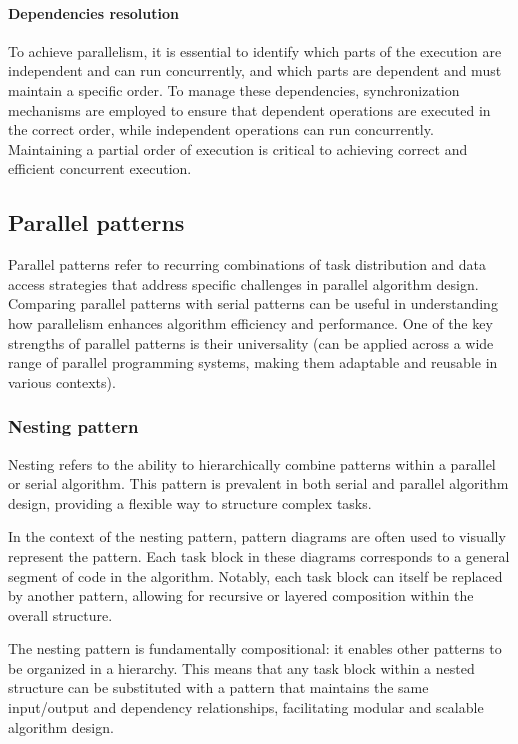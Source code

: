 \paragraph*{Dependencies resolution}
To achieve parallelism, it is essential to identify which parts of the execution are independent and can run concurrently, and which parts are dependent and must maintain a specific order.
To manage these dependencies, synchronization mechanisms are employed to ensure that dependent operations are executed in the correct order, while independent operations can run concurrently. 
Maintaining a partial order of execution is critical to achieving correct and efficient concurrent execution.

\subsection{Parallel patterns}
Parallel patterns refer to recurring combinations of task distribution and data access strategies that address specific challenges in parallel algorithm design. 
Comparing parallel patterns with serial patterns can be useful in understanding how parallelism enhances algorithm efficiency and performance.
One of the key strengths of parallel patterns is their universality (can be applied across a wide range of parallel programming systems, making them adaptable and reusable in various contexts).

\subsubsection{Nesting pattern}
Nesting refers to the ability to hierarchically combine patterns within a parallel or serial algorithm. 
This pattern is prevalent in both serial and parallel algorithm design, providing a flexible way to structure complex tasks.

In the context of the nesting pattern, pattern diagrams are often used to visually represent the pattern.
Each task block in these diagrams corresponds to a general segment of code in the algorithm.
Notably, each task block can itself be replaced by another pattern, allowing for recursive or layered composition within the overall structure.

The nesting pattern is fundamentally compositional: it enables other patterns to be organized in a hierarchy. 
This means that any task block within a nested structure can be substituted with a pattern that maintains the same input/output and dependency relationships, facilitating modular and scalable algorithm design.

